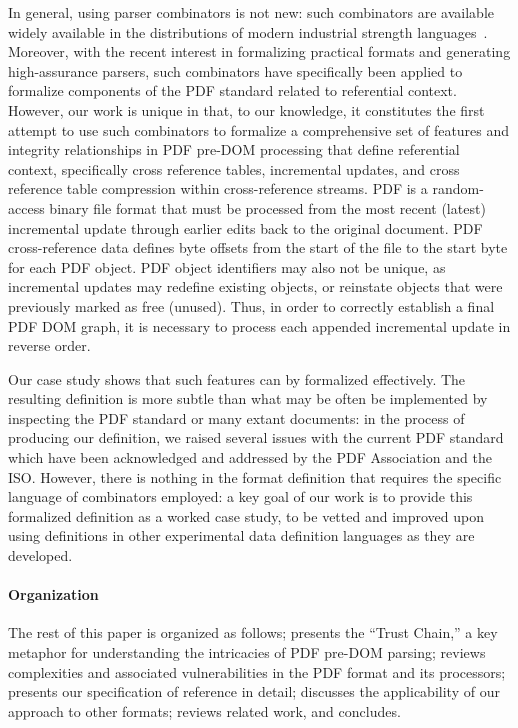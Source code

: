 In general, using parser combinators is not new: such combinators are
available widely available in the distributions of modern industrial
strength languages~\cite{leijen2001parsec,couprie2015nom,mundkurResearchReportParsley2020,bratus2017curing,willis2020staged}.
%
Moreover, with the recent interest in formalizing practical formats
and generating high-assurance parsers, such combinators have
specifically been applied to formalize components of the
PDF standard related to referential context.
%
However, our work is unique in that, to our knowledge, it constitutes
the first attempt to use such combinators to formalize a comprehensive
set of features and integrity relationships in PDF pre-DOM processing
that define referential context, specifically cross reference tables,
incremental updates, and cross reference table compression within
cross-reference streams. PDF is a random-access binary file format
that must be processed from the most recent (latest) incremental
update through earlier edits back to the original document.
%
PDF cross-reference data defines byte offsets from the start of the
file to the start byte for each PDF object. PDF object identifiers may
also not be unique, as incremental updates may redefine existing
objects, or reinstate objects that were previously marked as free
(unused).
%
Thus, in order to correctly establish a final PDF DOM graph, it is
necessary to process each appended incremental update in reverse
order.

Our case study shows that such features can by formalized effectively.
%
The resulting definition is more subtle than what may be often be
implemented by inspecting the PDF standard or many extant documents:
in the process of producing our definition, we raised several issues
with the current PDF standard which have been acknowledged and
addressed by the PDF Association and the ISO.
%
However, there is nothing in the format definition that requires the
specific language of combinators employed: a key goal of our work is
to provide this formalized definition as a worked case study, to be
vetted and improved upon using definitions in other experimental data
definition languages as they are developed.


\paragraph*{Organization} The rest of this paper is organized as
follows;
%
 presents the ``Trust Chain,'' a key metaphor
for understanding the intricacies of PDF pre-DOM parsing;
%
 reviews complexities and associated vulnerabilities in
the PDF format and its processors;
%
 presents our specification of reference in
detail;
%
 discusses the applicability of our approach
to other formats; 
%
 reviews related work, and %
 concludes.

